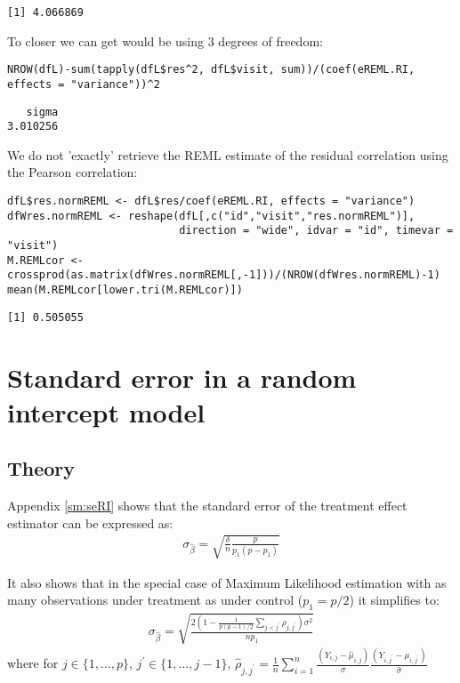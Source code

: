 \documentclass[12pt]{article}
\begin{document}
\begin{verbatim}
[1] 4.066869
\end{verbatim}


To closer we can get would be using 3 degrees of freedom:
\lstset{language=r,label= ,caption= ,captionpos=b,numbers=none}
\begin{lstlisting}
NROW(dfL)-sum(tapply(dfL$res^2, dfL$visit, sum))/(coef(eREML.RI, effects = "variance"))^2
\end{lstlisting}

\begin{verbatim}
   sigma 
3.010256
\end{verbatim}



We do not 'exactly' retrieve the REML estimate of the residual
correlation using the Pearson correlation:
\lstset{language=r,label= ,caption= ,captionpos=b,numbers=none}
\begin{lstlisting}
dfL$res.normREML <- dfL$res/coef(eREML.RI, effects = "variance")
dfWres.normREML <- reshape(dfL[,c("id","visit","res.normREML")],
                           direction = "wide", idvar = "id", timevar = "visit")
M.REMLcor <- crossprod(as.matrix(dfWres.normREML[,-1]))/(NROW(dfWres.normREML)-1)
mean(M.REMLcor[lower.tri(M.REMLcor)])
\end{lstlisting}

\begin{verbatim}
[1] 0.505055
\end{verbatim}


\clearpage

\section{Standard error in a random intercept model}
\label{sec:org2c1f733}

\subsection{Theory}
\label{sec:org5dc2765}

Appendix \ref{sm:seRI} shows that the standard error of the treatment
effect estimator can be expressed as:
\begin{align*}
\sigma_{\widehat{\beta}} =\sqrt{\frac{\delta}{n} \frac{p}{p_1(p-p_1)}}
\end{align*}

It also shows that in the special case of Maximum Likelihood
estimation with as many observations under treatment as under control
(\(p_1=p/2\)) it simplifies to:
\begin{align}
\sigma_{\widehat{\beta}} = \sqrt{\frac{2\left(1-\frac{1}{p(p-1)/2}\sum_{j < j^{\prime}} \rho_{j,j^{\prime}}\right) \sigma^2}{n p_1}} \label{eq:seML}
\end{align}
where for \(j \in \{1,\ldots,p\}\), \(j^{\prime} \in \{1,\ldots,j-1\}\),
  \(\widehat{\rho}_{j,j^{\prime}} = \frac{1}{n}\sum_{i=1}^n
  \frac{(Y_{i,j}-\widehat{\mu}_{i,j})}{\sigma}\frac{(Y_{i,j^{\prime}}-\mu_{i,j^{\prime}})}{\widehat{\sigma}}\)
\end{document}
